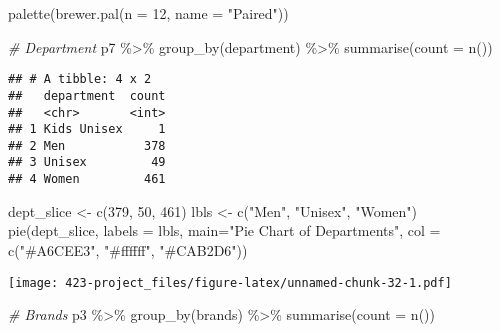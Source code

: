 \documentclass[
]{article}
\newenvironment{Shaded}{\begin{snugshade}}{\end{snugshade}}
\newcommand{\AttributeTok}[1]{\textcolor[rgb]{0.77,0.63,0.00}{#1}}
\newcommand{\CommentTok}[1]{\textcolor[rgb]{0.56,0.35,0.01}{\textit{#1}}}
\newcommand{\DecValTok}[1]{\textcolor[rgb]{0.00,0.00,0.81}{#1}}
\newcommand{\FunctionTok}[1]{\textcolor[rgb]{0.00,0.00,0.00}{#1}}
\newcommand{\NormalTok}[1]{#1}
\newcommand{\OtherTok}[1]{\textcolor[rgb]{0.56,0.35,0.01}{#1}}
\newcommand{\SpecialCharTok}[1]{\textcolor[rgb]{0.00,0.00,0.00}{#1}}
\newcommand{\StringTok}[1]{\textcolor[rgb]{0.31,0.60,0.02}{#1}}
\begin{document}
\begin{Shaded}
\begin{Highlighting}[]
\FunctionTok{palette}\NormalTok{(}\FunctionTok{brewer.pal}\NormalTok{(}\AttributeTok{n =} \DecValTok{12}\NormalTok{, }\AttributeTok{name =} \StringTok{"Paired"}\NormalTok{))}

\CommentTok{\# Department}
\NormalTok{p7 }\SpecialCharTok{\%\textgreater{}\%}
  \FunctionTok{group\_by}\NormalTok{(department) }\SpecialCharTok{\%\textgreater{}\%}
  \FunctionTok{summarise}\NormalTok{(}\AttributeTok{count =} \FunctionTok{n}\NormalTok{())}
\end{Highlighting}
\end{Shaded}

\begin{verbatim}
## # A tibble: 4 x 2
##   department  count
##   <chr>       <int>
## 1 Kids Unisex     1
## 2 Men           378
## 3 Unisex         49
## 4 Women         461
\end{verbatim}

\begin{Shaded}
\begin{Highlighting}[]
\NormalTok{dept\_slice }\OtherTok{\textless{}{-}} \FunctionTok{c}\NormalTok{(}\DecValTok{379}\NormalTok{, }\DecValTok{50}\NormalTok{, }\DecValTok{461}\NormalTok{)}
\NormalTok{lbls }\OtherTok{\textless{}{-}} \FunctionTok{c}\NormalTok{(}\StringTok{"Men"}\NormalTok{, }\StringTok{"Unisex"}\NormalTok{, }\StringTok{"Women"}\NormalTok{)}
\FunctionTok{pie}\NormalTok{(dept\_slice, }\AttributeTok{labels =}\NormalTok{ lbls, }\AttributeTok{main=}\StringTok{"Pie Chart of Departments"}\NormalTok{, }\AttributeTok{col =} \FunctionTok{c}\NormalTok{(}\StringTok{"\#A6CEE3"}\NormalTok{, }\StringTok{"\#ffffff"}\NormalTok{, }\StringTok{"\#CAB2D6"}\NormalTok{))}
\end{Highlighting}
\end{Shaded}

\texttt{[image: 423-project\_files/figure-latex/unnamed-chunk-32-1.pdf]}

\begin{Shaded}
\begin{Highlighting}[]
\CommentTok{\# Brands}
\NormalTok{p3 }\SpecialCharTok{\%\textgreater{}\%}
  \FunctionTok{group\_by}\NormalTok{(brands) }\SpecialCharTok{\%\textgreater{}\%}
  \FunctionTok{summarise}\NormalTok{(}\AttributeTok{count =} \FunctionTok{n}\NormalTok{())}
\end{Highlighting}
\end{Shaded}
\end{document}
